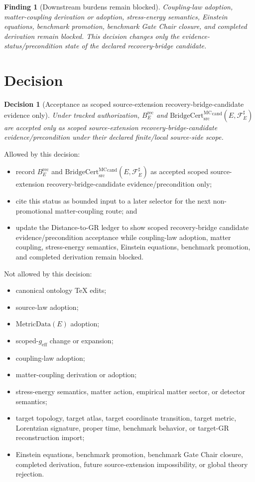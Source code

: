 \documentclass[11pt]{article}
\newcommand{\geff}{g_{\mathrm{eff}}}
\newcommand{\MetricData}{\mathrm{MetricData}}
\newcommand{\BridgeCert}{\mathrm{BridgeCert}_{\mathrm{src}}^{\mathrm{MC}}}
\newcommand{\BErec}{B_E^{\mathrm{rec}}}
\newtheorem{decision}{Decision}
\newtheorem{finding}{Finding}
\begin{document}
\begin{finding}[Downstream burdens remain blocked]
Coupling-law adoption, matter-coupling derivation or adoption, stress-energy
semantics, Einstein equations, benchmark promotion, benchmark Gate Chair
closure, and completed derivation remain blocked. This decision changes only
the evidence-status/precondition state of the declared recovery-bridge
candidate.
\end{finding}

\section{Decision}

\begin{decision}[Acceptance as scoped source-extension recovery-bridge-candidate evidence only]
Under tracked authorization, \(\BErec\) and
\(\BridgeCert^{\mathrm{cand}}(E,\mathcal{F}_E^\sharp)\) are accepted only as
scoped source-extension recovery-bridge-candidate evidence/precondition under
their declared finite/local source-side scope.
\end{decision}

Allowed by this decision:
\begin{itemize}[leftmargin=*]
  \item record \(\BErec\) and
  \(\BridgeCert^{\mathrm{cand}}(E,\mathcal{F}_E^\sharp)\) as accepted scoped
  source-extension recovery-bridge-candidate evidence/precondition only;
  \item cite this status as bounded input to a later selector for the next
  non-promotional matter-coupling route; and
  \item update the Distance-to-GR ledger to show scoped recovery-bridge
  candidate evidence/precondition acceptance while coupling-law adoption,
  matter coupling, stress-energy semantics, Einstein equations, benchmark
  promotion, and completed derivation remain blocked.
\end{itemize}

Not allowed by this decision:
\begin{itemize}[leftmargin=*]
  \item canonical ontology TeX edits;
  \item source-law adoption;
  \item \(\MetricData(E)\) adoption;
  \item scoped-\(\geff\) change or expansion;
  \item coupling-law adoption;
  \item matter-coupling derivation or adoption;
  \item stress-energy semantics, matter action, empirical matter sector, or
  detector semantics;
  \item target topology, target atlas, target coordinate transition, target
  metric, Lorentzian signature, proper time, benchmark behavior, or target-GR
  reconstruction import;
  \item Einstein equations, benchmark promotion, benchmark Gate Chair closure,
  completed derivation, future source-extension impossibility, or global
  theory rejection.
\end{itemize}
\end{document}
